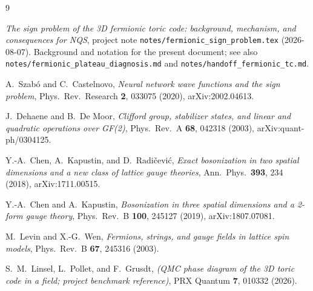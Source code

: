 \documentclass[11pt]{article}
\newcommand{\file}[1]{\texttt{#1}}
\begin{document}
\begin{thebibliography}{9}\small

\emph{The sign problem of the 3D fermionic toric code: background, mechanism,
and consequences for NQS}, project note
\file{notes/fermionic\_sign\_problem.tex} (2026-08-07). Background and
notation for the present document; see also
\file{notes/fermionic\_plateau\_diagnosis.md} and
\file{notes/handoff\_fermionic\_tc.md}.

A.~Szab\'o and C.~Castelnovo,
\emph{Neural network wave functions and the sign problem},
Phys.\ Rev.\ Research \textbf{2}, 033075 (2020), arXiv:2002.04613.

J.~Dehaene and B.~De Moor,
\emph{Clifford group, stabilizer states, and linear and quadratic operations
over GF(2)}, Phys.\ Rev.\ A \textbf{68}, 042318 (2003),
arXiv:quant-ph/0304125.

Y.-A.~Chen, A.~Kapustin, and D.~Radi\v{c}evi\'c,
\emph{Exact bosonization in two spatial dimensions and a new class of lattice
gauge theories}, Ann.\ Phys.\ \textbf{393}, 234 (2018), arXiv:1711.00515.

Y.-A.~Chen and A.~Kapustin,
\emph{Bosonization in three spatial dimensions and a 2-form gauge theory},
Phys.\ Rev.\ B \textbf{100}, 245127 (2019), arXiv:1807.07081.

M.~Levin and X.-G.~Wen,
\emph{Fermions, strings, and gauge fields in lattice spin models},
Phys.\ Rev.\ B \textbf{67}, 245316 (2003).

S.~M.~Linsel, L.~Pollet, and F.~Grusdt,
\emph{(QMC phase diagram of the 3D toric code in a field; project benchmark
reference)}, PRX Quantum \textbf{7}, 010332 (2026).

\end{thebibliography}
\end{document}
